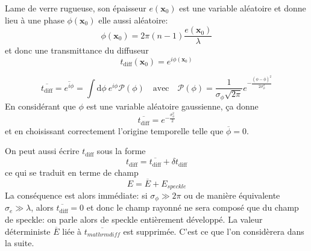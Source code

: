 Lame de verre rugueuse, son épaisseur $e(\mathbf{x}_0)$ est une variable aléatoire et donne lieu à une phase $\phi(\mathbf{x}_0)$ elle aussi aléatoire:
\begin{equation}
\phi(\mathbf{x}_0)=2\pi (n-1) \frac{e(\mathbf{x}_0)}{\lambda}
\end{equation}
et donc une transmittance du diffuseur 
\begin{equation}
t_{\mathrm{diff}}(\mathbf{x}_0)=e^{i\phi(\mathbf{x}_0)}
\end{equation}

\begin{equation}
\overline{t_{\mathrm{diff}}} = \overline{e^{i\phi}} = \int{\mathrm{d}\phi \: e^{i\phi} \mathcal{P}(\phi)} \quad\text{avec}\quad \mathcal{P}(\phi)=\frac{1}{\sigma_{\phi} \sqrt{2\pi}} e^{-\frac{(\phi-\overline{\phi})^2}{2\sigma_{\phi}^2}}
\end{equation}
En considérant que $\phi$ est une variable aléatoire gaussienne, ça donne
\begin{equation}
\overline{t_{\mathrm{diff}}}=e^{-\frac{\sigma_{\phi}^2}{2}}
\end{equation}
et en choisissant correctement l'origine temporelle telle que $\overline{\phi}=0$.

On peut aussi écrire $t_{\mathrm{diff}}$ sous la forme
\begin{equation}
t_{\mathrm{diff}}=\overline{t_{\mathrm{diff}}}+\delta t_{\mathrm{diff}}
\end{equation}
ce qui se traduit en terme de champ
\begin{equation}
E=\overline{E}+E_{speckle}
\end{equation}
La conséquence est alors immédiate: si $\sigma_{\phi} \gg 2\pi$ ou de manière équivalente $\sigma_e \gg \lambda$, alors $\overline{t_{\mathrm{diff}}} =0$ et donc le champ rayonné ne sera composé que du champ de speckle: on parle alors de speckle entièrement développé. La valeur déterministe $\overline{E}$ liée à $\overline{t_{mathrm{diff}}}$ est supprimée. C'est ce que l'on considèrera dans la suite.

